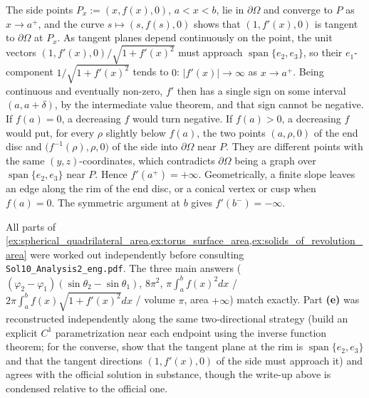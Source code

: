 \begin{exercisesolution}
\begin{enumerate}[label=\textbf{(\alph*)}]
    The side points $P_x := (x,f(x),0)$, $a<x<b$, lie in $\partial\Omega$ and converge to $P$ as
    $x \to a^+$, and the curve $s \mapsto (s,f(s),0)$ shows that $(1,f'(x),0)$ is tangent to
    $\partial\Omega$ at $P_x$. As tangent planes depend continuously on the point, the unit
    vectors $(1,f'(x),0)/\sqrt{1+f'(x)^2}$ must approach $\operatorname{span}\{e_2,e_3\}$, so
    their $e_1$-component $1/\sqrt{1+f'(x)^2}$ tends to $0$: $\lvert f'(x)\rvert \to \infty$ as
    $x \to a^+$. Being continuous and eventually non-zero, $f'$ then has a single sign on some
    interval $(a,a+\delta)$, by the intermediate value theorem, and that sign cannot be negative.
    If $f(a) = 0$, a decreasing $f$ would turn negative. If $f(a) > 0$, a decreasing $f$ would
    put, for every $\rho$ slightly below $f(a)$, the two points $(a,\rho,0)$ of the end disc and
    $\big(f^{-1}(\rho),\rho,0\big)$ of the side into $\partial\Omega$ near $P$. They are different
    points with the same $(y,z)$-coordinates, which contradicts $\partial\Omega$ being a graph over
    $\operatorname{span}\{e_2,e_3\}$ near $P$. Hence $f'(a^+)=+\infty$. Geometrically, a finite
    slope leaves an edge along the rim of the end disc, or a conical vertex or cusp when
    $f(a) = 0$. The symmetric argument at $b$ gives $f'(b^-)=-\infty$.
\end{enumerate}
\end{exercisesolution}

\begin{ainote}
All parts of \cref{ex:spherical_quadrilateral_area,ex:torus_surface_area,ex:solids_of_revolution_area} were worked out independently before consulting
\texttt{Sol10\_Analysis2\_eng.pdf}. The three main answers ($(\varphi_2-\varphi_1)(\sin\theta_2
-\sin\theta_1)$, $8\pi^2$, $\pi\int_a^bf(x)^2dx$ / $2\pi\int_a^bf(x)\sqrt{1+f'(x)^2}dx$ /
volume $\pi$, area $+\infty$) match exactly. Part \textbf{(e)} was reconstructed independently
along the same two-directional strategy (build an explicit $C^1$ parametrization near each
endpoint using the inverse function theorem; for the converse, show that the tangent plane at the
rim is $\operatorname{span}\{e_2,e_3\}$ and that the tangent directions $(1,f'(x),0)$ of the side
must approach it) and agrees with the official solution in substance, though the write-up above
is condensed relative to the official one.
\end{ainote}

